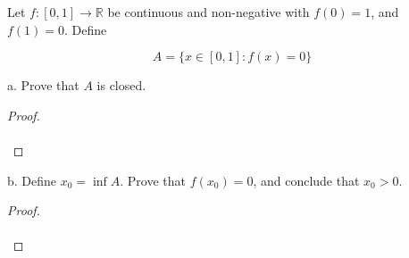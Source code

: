 Let $f:[0, 1] \to \mathbb{R}$ be continuous and non-negative with $f(0) = 1$, and $f(1) = 0$. Define

\begin{equation*}
    A = \{x \in [0, 1]: f(x) = 0 \}
\end{equation*}

a.  Prove that $A$ is closed.

\begin{proof}\renewcommand{\qedsymbol}{}\ \\\\
\end{proof}

\pagebreak

b.  Define $x_0 = \inf{A}$. Prove that $f(x_0) = 0$, and conclude that $x_0 > 0$.

\begin{proof}\renewcommand{\qedsymbol}{}\ \\\\
\end{proof}